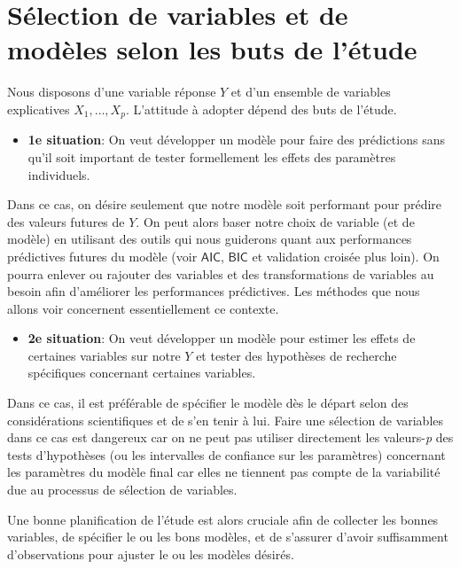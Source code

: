 \documentclass[
  11pt,
  letterpaper,
]{scrbook}
\providecommand{\tightlist}{%
  \setlength{\itemsep}{0pt}\setlength{\parskip}{0pt}}\usepackage{longtable,booktabs,array}
\theoremstyle{definition}
\theoremstyle{remark}
\begin{document}
\hypertarget{suxe9lection-de-variables-et-de-moduxe8les-selon-les-buts-de-luxe9tude}{%
\section{Sélection de variables et de modèles selon les buts de
l'étude}\label{suxe9lection-de-variables-et-de-moduxe8les-selon-les-buts-de-luxe9tude}}

Nous disposons d'une variable réponse \(Y\) et d'un ensemble de
variables explicatives \(X_1, \ldots, X_p\). L'attitude à adopter dépend
des buts de l'étude.

\begin{itemize}
\tightlist
\item
  \textbf{1e situation}: On veut développer un modèle pour faire des
  prédictions sans qu'il soit important de tester formellement les
  effets des paramètres individuels.
\end{itemize}

Dans ce cas, on désire seulement que notre modèle soit performant pour
prédire des valeurs futures de \(Y\). On peut alors baser notre choix de
variable (et de modèle) en utilisant des outils qui nous guiderons quant
aux performances prédictives futures du modèle (voir \(\mathsf{AIC}\),
\(\mathsf{BIC}\) et validation croisée plus loin). On pourra enlever ou
rajouter des variables et des transformations de variables au besoin
afin d'améliorer les performances prédictives. Les méthodes que nous
allons voir concernent essentiellement ce contexte.

\begin{itemize}
\tightlist
\item
  \textbf{2e situation}: On veut développer un modèle pour estimer les
  effets de certaines variables sur notre \(Y\) et tester des hypothèses
  de recherche spécifiques concernant certaines variables.
\end{itemize}

Dans ce cas, il est préférable de spécifier le modèle dès le départ
selon des considérations scientifiques et de s'en tenir à lui. Faire une
sélection de variables dans ce cas est dangereux car on ne peut pas
utiliser directement les valeurs-\emph{p} des tests d'hypothèses (ou les
intervalles de confiance sur les paramètres) concernant les paramètres
du modèle final car elles ne tiennent pas compte de la variabilité due
au processus de sélection de variables.

Une bonne planification de l'étude est alors cruciale afin de collecter
les bonnes variables, de spécifier le ou les bons modèles, et de
s'assurer d'avoir suffisamment d'observations pour ajuster le ou les
modèles désirés.
\end{document}
